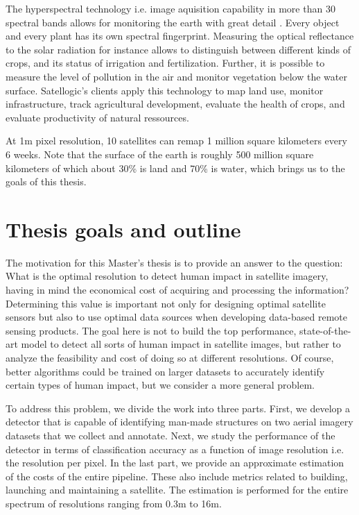 The hyperspectral technology i.e. image aquisition capability in more than 30 spectral bands allows for monitoring the earth with great detail \parencite{satellogic2019}. Every object and every plant has its own spectral fingerprint. Measuring the optical reflectance to the solar radiation for instance allows to distinguish between different kinds of crops, and its status of irrigation and fertilization. Further, it is possible to measure the level of pollution in the air and monitor vegetation below the water surface. Satellogic's clients apply this technology to map land use, monitor infrastructure, track agricultural development, evaluate the health of crops, and evaluate productivity of natural ressources.

At 1m pixel resolution, 10 satellites can remap 1 million square kilometers every 6 weeks. Note that the surface of the earth is roughly 500 million square kilometers of which about 30\% is land and 70\% is water, which brings us to the goals of this thesis.


\section{Thesis goals and outline}
The motivation for this Master's thesis is to provide an answer to the question: What is the optimal resolution to detect human impact in satellite imagery, having in mind the economical cost of acquiring and processing the information? 
Determining this value is important not only for designing optimal satellite sensors but also to use optimal data sources when developing data-based remote sensing products. The goal here is not to build the top performance, state-of-the-art model to detect all sorts of human impact in satellite images, but rather to analyze the feasibility and cost of doing so at different resolutions. Of course, better algorithms could be trained on larger datasets to accurately identify certain types of human impact, but we consider a more general problem.

To address this problem, we divide the work into three parts. First, we develop a detector that is capable of identifying man-made structures on two aerial imagery datasets that we collect and annotate. Next, we study the performance of the detector in terms of classification accuracy as a function of image resolution i.e. the resolution per pixel. In the last part, we provide an approximate estimation of the costs of the entire pipeline. These also include metrics related to building, launching and maintaining a satellite. The estimation is performed for the entire spectrum of resolutions ranging from 0.3m to 16m.

